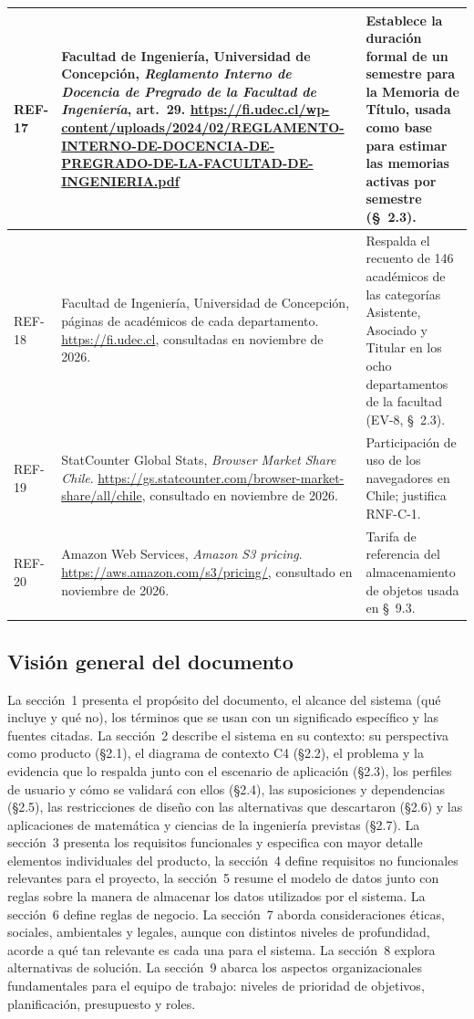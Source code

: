 \documentclass[10pt,a4paper]{article}
\newcommand{\nota}[1]{{\small\itshape\color{nota}#1\par}}
\begin{document}
\begin{xltabular}{\linewidth}{|P{1.6cm}|L|P{5.5cm}|}
REF-17 & Facultad de Ingeniería, Universidad de Concepción, \emph{Reglamento Interno de Docencia de Pregrado de la Facultad de Ingeniería}, art.~29. \url{https://fi.udec.cl/wp-content/uploads/2024/02/REGLAMENTO-INTERNO-DE-DOCENCIA-DE-PREGRADO-DE-LA-FACULTAD-DE-INGENIERIA.pdf} & Establece la duración formal de un semestre para la Memoria de Título, usada como base para estimar las memorias activas por semestre (\S~2.3). \\ \hline
REF-18 & Facultad de Ingeniería, Universidad de Concepción, páginas de académicos de cada departamento. \url{https://fi.udec.cl}, consultadas en noviembre de 2026. & Respalda el recuento de 146 académicos de las categorías Asistente, Asociado y Titular en los ocho departamentos de la facultad (EV-8, \S~2.3). \\ \hline
REF-19 & StatCounter Global Stats, \emph{Browser Market Share Chile}. \url{https://gs.statcounter.com/browser-market-share/all/chile}, consultado en noviembre de 2026. & Participación de uso de los navegadores en Chile; justifica RNF-C-1. \\ \hline
REF-20 & Amazon Web Services, \emph{Amazon S3 pricing}. \url{https://aws.amazon.com/s3/pricing/}, consultado en noviembre de 2026. & Tarifa de referencia del almacenamiento de objetos usada en \S~9.3. \\ \hline
\end{xltabular}

\subsection{Visión general del documento}
La sección~1 presenta el propósito del documento, el alcance del sistema (qué incluye y qué no), los términos que se usan con un significado específico y las fuentes citadas. La sección~2 describe el sistema en su contexto: su perspectiva como producto (§2.1), el diagrama de contexto C4 (§2.2), el problema y la evidencia que lo respalda junto con el escenario de aplicación (§2.3), los perfiles de usuario y cómo se validará con ellos (§2.4), las suposiciones y dependencias (§2.5), las restricciones de diseño con las alternativas que descartaron (§2.6) y las aplicaciones de matemática y ciencias de la ingeniería previstas (§2.7). La sección~3 presenta los requisitos funcionales y especifica con mayor detalle elementos individuales del producto, la sección~4 define requisitos no funcionales relevantes para el proyecto, la sección~5 resume el modelo de datos junto con reglas sobre la manera de almacenar los datos utilizados por el sistema. La sección~6 define reglas de negocio. La sección~7 aborda consideraciones éticas, sociales, ambientales y legales, aunque con distintos niveles de profundidad, acorde a qué tan relevante es cada una para el sistema. La sección~8 explora alternativas de solución. La sección~9 abarca los aspectos organizacionales fundamentales para el equipo de trabajo: niveles de prioridad de objetivos, planificación, presupuesto y roles.
\end{document}
